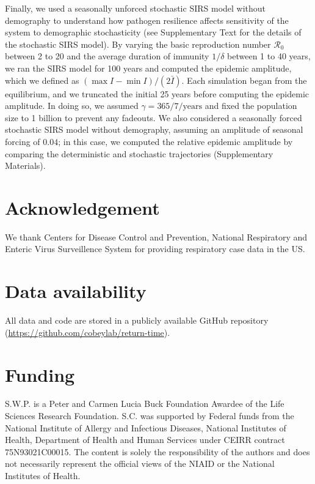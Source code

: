 \documentclass[12pt]{article}
\begin{document}
Finally, we used a seasonally unforced stochastic SIRS model without demography to understand how pathogen resilience affects sensitivity of the system to demographic stochasticity (see Supplementary Text for the details of the stochastic SIRS model).
By varying the basic reproduction number $\mathcal R_0$ between 2 to 20 and the average duration of immunity $1/\delta$ between 1 to 40 years, we ran the SIRS model for 100 years and computed the epidemic amplitude, which we defined as  $(\max I - \min I)/(2 \bar{I})$.
Each simulation began from the equilibrium, and we truncated the initial 25 years before computing the epidemic amplitude.
In doing so, we assumed $\gamma=365/7/\mathrm{years}$ and fixed the population size to 1 billion to prevent any fadeouts.
We also considered a seasonally forced stochastic SIRS model without demography, assuming an amplitude of seasonal forcing of $0.04$;
in this case, we computed the relative epidemic amplitude by comparing the deterministic and stochastic trajectories (Supplementary Materials).

\section*{Acknowledgement}

We thank Centers for Disease Control and Prevention, National Respiratory and Enteric Virus Surveillence System for providing respiratory case data in the US.

\section*{Data availability}

All data and code are stored in a publicly available GitHub repository (\url{https://github.com/cobeylab/return-time}).

\section*{Funding}

S.W.P. is a Peter and Carmen Lucia Buck Foundation Awardee of the Life Sciences Research Foundation. 
S.C. was supported by Federal funds from the National Institute of Allergy and Infectious Diseases, National Institutes of Health, Department of Health and Human Services under CEIRR contract 75N93021C00015. The content is solely the responsibility of the authors and does not necessarily represent the official views of the NIAID or the National Institutes of Health. 
\end{document}

